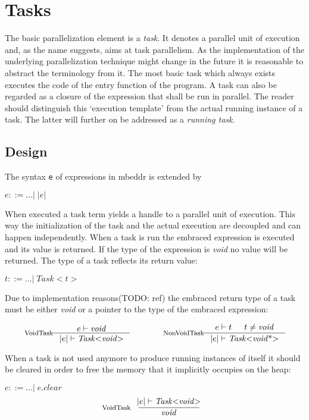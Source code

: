 \section{Tasks}
The basic parallelization element is a \textit{task}. It denotes a parallel unit of execution and, as the name suggests, aims at task parallelism. As the implementation of the underlying parallelization technique might change in the future it is reasonable to abstract the terminology from it. The most basic task which always exists executes the code of the entry function of the program. A task can also be regarded as a closure of the expression that shall be run in parallel. The reader should distinguish this `execution template' from the actual running instance of a task. The latter will further on be addressed as a \textit{running task}.
\subsection{Design}
The syntax \texttt{e} of expressions in mbeddr is extended by

$e ::= ...|\;\mathit{|e|}$

When executed a task term yields a handle to a parallel unit of execution. This way the initialization of the task and the actual execution are decoupled and can happen independently. When a task is run the embraced expression is executed and its value is returned. If the type of the expression is \textit{void} no value will be returned. The type of a task reflects its return value:

$t ::= ... |\;\mathit{Task{<}t{>}}$

Due to implementation reasons(TODO: ref) the embraced return type of a task must be either \textit{void} or a pointer to the type of the embraced expression:

\begin{align*}
\inference*[VoidTask]{e |- \mathit{void}}{|e| |- \mathit{Task{<}void{>}}} 
\qquad\qquad
\inference*[NonVoidTask]{e |- t & t \neq \mathit{void}}{|e| |- \mathit{Task{<}void{\text{*}}{>}}}
\end{align*}

When a task is not used anymore to produce running instances of itself it should be cleared in order to free the memory that it implicitly occupies on the heap:

$e ::= ...|\;e.\mathit{clear}$
\begin{align*}
\inference*[VoidTask]{|e| |- \mathit{Task{<}void{>}}}{\qquad\mathit{void}\qquad} 
\end{align*}

